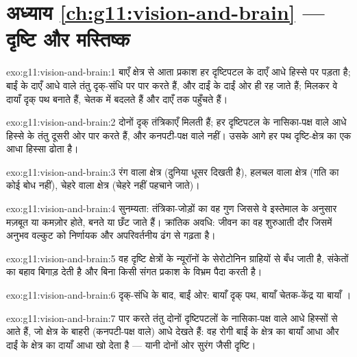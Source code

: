 \section*{अध्याय \ref{ch:g11:vision-and-brain} --- दृष्टि और मस्तिष्क}

\begin{solution}{exo:g11:vision-and-brain:1}
बाएँ क्षेत्र से आता प्रकाश हर दृष्टिपटल के दाएँ आधे हिस्से पर पड़ता है;
बाईं  के दाएँ आधे वाले तंतु दृक्-संधि पर पार करते हैं, और दाईं  के दाईं ओर
ही रह जाते हैं; मिलकर वे दायाँ दृक् पथ बनाते हैं, चेतक में बदलते हैं और
दाएँ  तक पहुँचते हैं।
\end{solution}

\begin{solution}{exo:g11:vision-and-brain:2}
दोनों दृक् तंत्रिकाएँ मिलती हैं; हर दृष्टिपटल के नासिका-पक्ष वाले आधे हिस्से
के तंतु दूसरी ओर पार करते हैं, और कनपटी-पक्ष वाले नहीं। उसके आगे हर पथ
दृष्टि-क्षेत्र का एक आधा हिस्सा ढोता है।
\end{solution}

\begin{solution}{exo:g11:vision-and-brain:3}
रंग वाला क्षेत्र (दुनिया धूसर दिखती है), हलचल वाला क्षेत्र (गति का कोई बोध
नहीं), चेहरे वाला क्षेत्र (चेहरे नहीं पहचाने जाते)।
\end{solution}

\begin{solution}{exo:g11:vision-and-brain:4}
सुनम्यता: तंत्रिका-जोड़ों का वह गुण जिससे वे इस्तेमाल के अनुसार मज़बूत या
कमज़ोर होते, बनते या छँट जाते हैं। क्रांतिक अवधि: जीवन का वह शुरुआती दौर
जिसमें अनुभव वल्कुट को निर्णायक और अपरिवर्तनीय ढंग से गढ़ता है।
\end{solution}

\begin{solution}{exo:g11:vision-and-brain:5}
वह दृष्टि क्षेत्रों के न्यूरॉनों के सेरोटोनिन ग्राहियों से बँध जाती है,
संकेतों का बहाव बिगाड़ देती है और बिना किसी संगत प्रकाश के विभ्रम पैदा
करती है।
\end{solution}

\begin{solution}{exo:g11:vision-and-brain:6}
दृक्-संधि के बाद, बाईं ओर: बायाँ दृक् पथ, बायाँ चेतक-केंद्र या बायाँ ।
\end{solution}

\begin{solution}{exo:g11:vision-and-brain:7}
पार करते तंतु दोनों दृष्टिपटलों के नासिका-पक्ष वाले आधे हिस्सों से आते हैं,
जो क्षेत्र के बाहरी (कनपटी-पक्ष वाले) आधे देखते हैं: वह रोगी बाईं  के
क्षेत्र का बायाँ आधा और दाईं  के क्षेत्र का दायाँ आधा खो देता है ---
यानी दोनों ओर सुरंग जैसी दृष्टि।
\end{solution}

